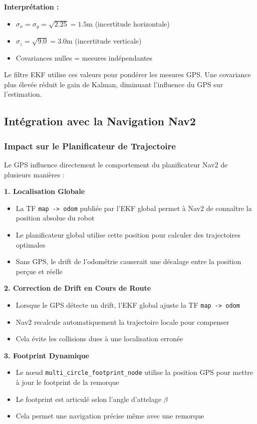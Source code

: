 \documentclass[a4paper,12pt]{article}
\begin{document}
\textbf{Interprétation :}
\begin{itemize}
    \item $\sigma_x = \sigma_y = \sqrt{2.25} = 1.5$m (incertitude horizontale)
    \item $\sigma_z = \sqrt{9.0} = 3.0$m (incertitude verticale)
    \item Covariances nulles = mesures indépendantes
\end{itemize}

Le filtre EKF utilise ces valeurs pour pondérer les mesures GPS. Une covariance plus élevée réduit le gain de Kalman, diminuant l'influence du GPS sur l'estimation.

\subsection{Intégration avec la Navigation Nav2}

\subsubsection{Impact sur le Planificateur de Trajectoire}

Le GPS influence directement le comportement du planificateur Nav2 de plusieurs manières :

\textbf{1. Localisation Globale}
\begin{itemize}
    \item La TF \texttt{map -> odom} publiée par l'EKF global permet à Nav2 de connaître la position absolue du robot
    \item Le planificateur global utilise cette position pour calculer des trajectoires optimales
    \item Sans GPS, le drift de l'odométrie causerait une décalage entre la position perçue et réelle
\end{itemize}

\textbf{2. Correction de Drift en Cours de Route}
\begin{itemize}
    \item Lorsque le GPS détecte un drift, l'EKF global ajuste la TF \texttt{map -> odom}
    \item Nav2 recalcule automatiquement la trajectoire locale pour compenser
    \item Cela évite les collisions dues à une localisation erronée
\end{itemize}

\textbf{3. Footprint Dynamique}
\begin{itemize}
    \item Le nœud \texttt{multi\_circle\_footprint\_node} utilise la position GPS pour mettre à jour le footprint de la remorque
    \item Le footprint est articulé selon l'angle d'attelage $\beta$
    \item Cela permet une navigation précise même avec une remorque
\end{itemize}
\end{document}

